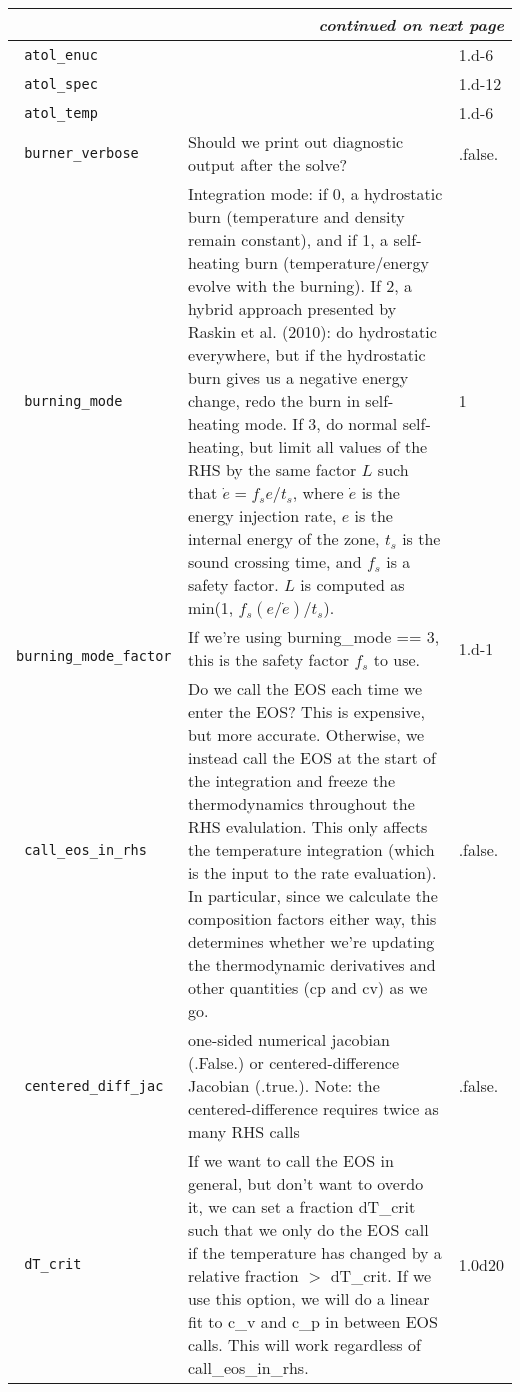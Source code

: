 \begin{landscape}
{\begin{center}
\begin{longtable}{|l|p{5.25in}|l|}
\multicolumn{3}{|r|}{{\em continued on next page}} \\ \hline
\endfoot

\hline
\endlastfoot


\rowcolor{tableShade}
\verb= atol_enuc = &  & 1.d-6 \\
\verb= atol_spec = &  & 1.d-12 \\
\rowcolor{tableShade}
\verb= atol_temp = &  & 1.d-6 \\
\verb= burner_verbose = &  Should we print out diagnostic output after the solve? & .false. \\
\rowcolor{tableShade}
\verb= burning_mode = &  Integration mode: if 0, a hydrostatic burn (temperature and density remain constant), and if 1, a self-heating burn (temperature/energy evolve with the burning). If 2, a hybrid approach presented by Raskin et al. (2010): do hydrostatic everywhere, but if the hydrostatic burn gives us a negative energy change, redo the burn in self-heating mode.  If 3, do normal self-heating, but limit all values of the RHS by the same factor $L$ such that $\dot{e} = f_s e / t_s$, where $\dot{e}$ is the energy injection rate, $e$ is the internal energy of the zone, $t_s$ is the sound crossing time, and $f_s$ is a safety factor. $L$ is computed as min(1, $f_s (e / \dot{e}) / t_s$). & 1 \\
\verb= burning_mode_factor = &  If we're using burning\_mode == 3, this is the safety factor $f_s$ to use. & 1.d-1 \\
\rowcolor{tableShade}
\verb= call_eos_in_rhs = &  Do we call the EOS each time we enter the EOS?  This is expensive, but more accurate.  Otherwise, we instead call the EOS at the start of the integration and freeze the thermodynamics throughout the RHS evalulation.  This only affects the temperature integration (which is the input to the rate evaluation). In particular, since we calculate the composition factors either way, this determines whether we're updating the thermodynamic derivatives and other quantities (cp and cv) as we go. & .false. \\
\verb= centered_diff_jac = &  one-sided numerical jacobian (.False.) or centered-difference Jacobian (.true.).  Note: the centered-difference requires twice as many RHS calls & .false. \\
\rowcolor{tableShade}
\verb= dT_crit = &  If we want to call the EOS in general, but don't want to overdo it, we can set a fraction dT\_crit such that we only do the EOS call if the temperature has changed by a relative fraction $>$ dT\_crit. If we use this option, we will do a linear fit to c\_v and c\_p in between EOS calls. This will work regardless of call\_eos\_in\_rhs. & 1.0d20 \\

\end{longtable}
\end{center}}
\end{landscape}
